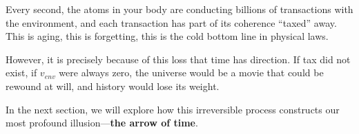 Every second, the atoms in your body are conducting billions of transactions with the environment, and each transaction has part of its coherence ``taxed'' away. This is aging, this is forgetting, this is the cold bottom line in physical laws.

However, it is precisely because of this loss that time has direction. If tax did not exist, if $v_{env}$ were always zero, the universe would be a movie that could be rewound at will, and history would lose its weight.

In the next section, we will explore how this irreversible process constructs our most profound illusion---\textbf{the arrow of time}.

